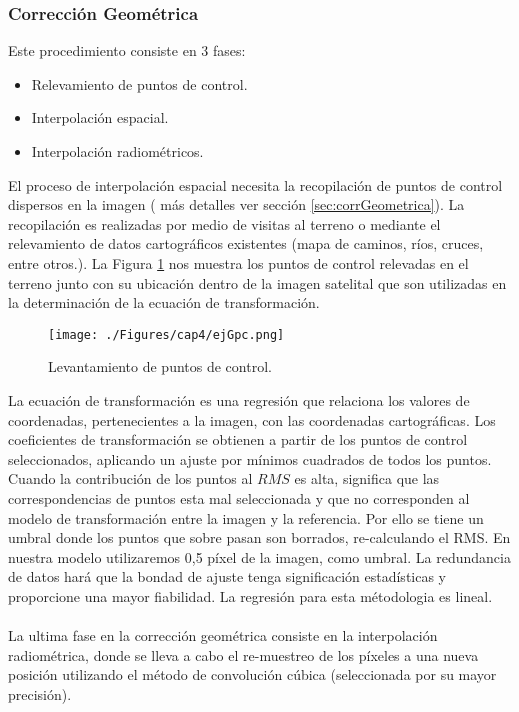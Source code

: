 \subsubsection{Correcci\'on Geom\'etrica}
Este procedimiento consiste en 3 fases:
\begin{itemize}
	\item Relevamiento de puntos de control.
	\item Interpolaci\'on espacial.
	\item Interpolaci\'on radiom\'etricos.
\end{itemize}

El proceso de interpolación espacial necesita la recopilación de puntos de control dispersos en la imagen ( más detalles ver secci\'on \ref{sec:corrGeometrica}). La recopilaci\'on es realizadas por medio de visitas al terreno o mediante el relevamiento de datos cartogr\'aficos existentes (mapa de caminos, ríos, cruces, entre otros.). La Figura \ref{fig:gcp} nos muestra los puntos de control relevadas en el terreno junto con su ubicaci\'on dentro de la imagen satelital que son utilizadas en la determinaci\'on de la ecuaci\'on de transformaci\'on.
\begin{figure}[H]
	\centering
	\texttt{[image: ./Figures/cap4/ejGpc.png]}
	\caption{Levantamiento de puntos de control.}
	\label{fig:gcp}
\end{figure}

La ecuaci\'on de transformaci\'on es una regresi\'on que relaciona los valores de coordenadas, pertenecientes a la imagen, con las coordenadas cartogr\'aficas. Los coeficientes de transformaci\'on se obtienen a partir de los puntos de control seleccionados, aplicando un ajuste por m\'inimos cuadrados de todos los puntos. Cuando la contribuci\'on de los puntos al $ RMS $ es alta, significa que las correspondencias de puntos esta mal seleccionada y que no corresponden al modelo de transformaci\'on entre la imagen y la referencia. Por ello se tiene un umbral donde los puntos que sobre pasan son borrados, re-calculando el RMS. En nuestra modelo utilizaremos 0,5 p\'ixel de la imagen, como umbral. La redundancia de datos har\'a que la bondad de ajuste tenga significaci\'on estad\'isticas y proporcione una mayor fiabilidad. La regresi\'on para esta m\'etodologia es lineal.\\~\\
La ultima fase en la correcci\'on geom\'etrica consiste en la interpolaci\'on radiom\'etrica, donde se lleva a cabo el re-muestreo de los p\'ixeles a una nueva posici\'on utilizando el m\'etodo de convoluci\'on c\'ubica (seleccionada por su mayor precisi\'on).\\~\\

